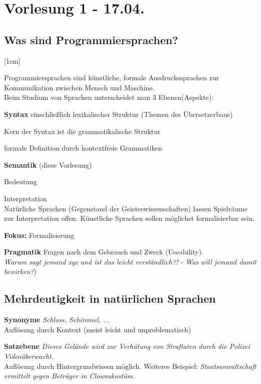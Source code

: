 \section{Vorlesung 1 - 17.04.}
\subsection{Was sind Programmiersprachen?}
[1cm]

Programmiersprachen sind künstliche, formale Ausdruckssprachen zur Kommunikation zwischen Mensch und Maschine.\\
Beim Studium von Sprachen unterscheidet man 3 Ebenen(Aspekte):
\begin{compactitem}
	\item [\textbf{Syntax}] einschließlich lexikalischer Struktur (Themen des Übersetzerbaus)
	\begin{compactitem}
		\item Kern der Syntax ist die grammatikalische Struktur
		\item formale Definition durch kontextfreie Grammatiken
	\end{compactitem}
	\item [\textbf{Semantik}] (diese Vorlesung)
	\begin{compactitem}
		\item Bedeutung
		\item Interpretation \\
		Natürliche Sprachen (Gegenstand der Geisteswissenschaften) lassen Spielräume zur Interpretation offen. Künstliche Sprachen sollen möglichst formalisierbar sein.
		\item [\textbf{Fokus:}] Formalisierung
	\end{compactitem}
	\item [\textbf{Pragmatik}] Fragen nach dem Gebrauch und Zweck (Useability).\\ 
	\emph{Warum sagt jemand xyz und ist das leicht verständlich?! - Was will jemand damit bewirken?})
\end{compactitem}
\subsection{Mehrdeutigkeit in natürlichen Sprachen}
\begin{compactitem}
	\item [\textbf{Synonyme}] \emph{Schloss, Schimmel, ...}\\
	Auflösung durch Kontext (meist leicht und unproblematisch)
	\item [\textbf{Satzebene}] \emph{Dieses Gelände wird zur Verhütung von Straftaten durch die Polizei Videoüberwacht.}\\
	Auflösung durch Hintergrundwissen möglich. Weiteres Beispiel: \emph{Staatsanwaltschaft ermittelt gegen Betrüger in Clownskostüm.}
\end{compactitem}

